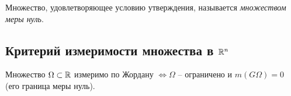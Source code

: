 \begin{definition}
    Множество, удовлетворяющее условию утверждения, называется \emph{множеством меры нуль}.
\end{definition}

\subsection{Критерий измеримости множества в $\mathbb{R}^n$}

\begin{theorem}
    Множество $ \Omega \subset \mathbb{R} $ измеримо по Жордану $ \iff \Omega $ -- ограничено и $ m(G\Omega) = 0 $ (его граница меры нуль).
\end{theorem}

\newpage
